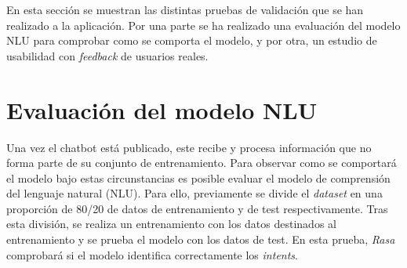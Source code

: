 En esta sección se muestran las distintas pruebas de validación que se han realizado a la aplicación. Por una parte se ha realizado una evaluación del modelo NLU para comprobar como se comporta el modelo, y por otra, un estudio de usabilidad con \textit{feedback} de usuarios reales.\\
 

\section{Evaluación del modelo NLU}
Una vez el chatbot está publicado, este recibe y procesa información que no forma parte de su conjunto de entrenamiento. Para observar como se comportará el modelo bajo estas circunstancias es posible evaluar el modelo de comprensión del lenguaje natural (NLU). Para ello, previamente se divide el \textit{dataset} en una proporción de 80/20 de datos de entrenamiento y de test respectivamente. Tras esta división, se realiza un entrenamiento con los datos destinados al entrenamiento y se prueba el modelo con los datos de test. En esta prueba, \textit{Rasa} comprobará si el modelo identifica correctamente los \textit{intents}.\\     

